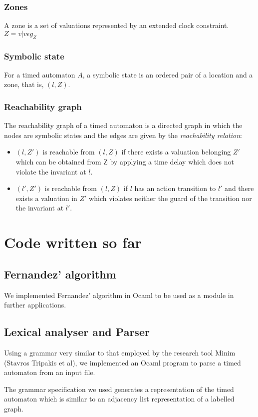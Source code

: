 \documentclass{article}
\begin{document}
\subsubsection{Zones}
A zone is a set of valuations represented by an
extended clock constraint.\\
$Z = {v|v \epsilon g_Z}$
\subsubsection{Symbolic state}
For a timed automaton $A$, a symbolic
state is an ordered pair of a location and a zone, that is, $(l,
Z)$.
\subsubsection{Reachability graph}
The reachability graph of a timed
automaton is a directed graph in which the nodes are symbolic states
and the edges are given by the \emph{reachability relation}:
\begin{itemize}
\item $(l,Z')$ is reachable from $(l,Z)$ if there exists a
  valuation belonging $Z'$ which can be obtained
  from Z by applying a time delay which does not violate the
  invariant at $l$.

\item $(l', Z')$ is reachable from $(l, Z)$ if $l$ has an action
  transition to $l'$ and there exists a valuation in $Z'$ which
  violates neither the guard of the
  transition nor the invariant at $l'$.
\end{itemize}

\section{Code written so far}

\subsection{Fernandez' algorithm}

We implemented Fernandez' algorithm in Ocaml to be used as a module in
further applications.

\subsection{Lexical analyser and Parser}

Using a grammar very similar to that employed by the research tool Minim (Stavros
Tripakis et al), we implemented an Ocaml program to parse a timed
automaton from an input file.

The grammar specification we used generates a representation of the
timed automaton which is similar to an adjacency list representation
of a labelled graph.
\end{document}
